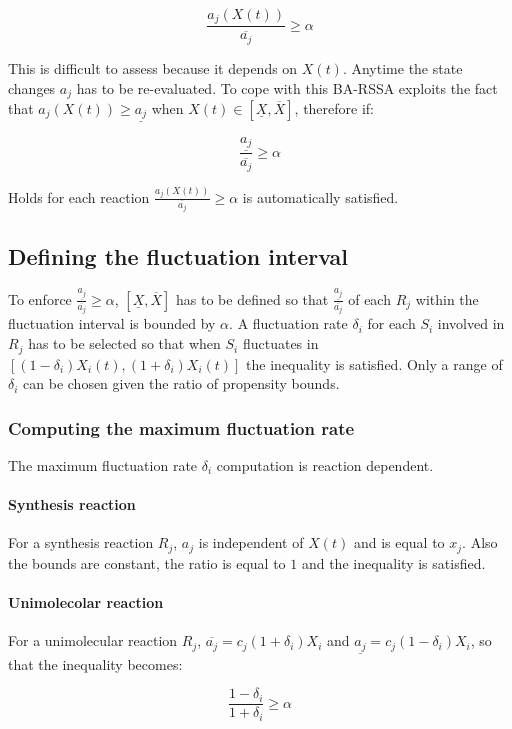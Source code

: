   $$\frac{a_j(X(t))}{\overline{a_j}} \ge \alpha$$

  This is difficult to assess because it depends on $X(t)$.
  Anytime the state changes $a_j$ has to be re-evaluated.
  To cope with this BA-RSSA exploits the fact that $a_j(X(t))\ge \underline{a_j}$ when $X(t)\in[\underline{X}, \overline{X}]$, therefore if:

  $$\frac{\underline{a_j}}{\overline{a_j}}\ge \alpha$$

  Holds for each reaction $\frac{a_j(X(t))}{\overline{a_j}} \ge\alpha$ is automatically satisfied.

  \subsection{Defining the fluctuation interval}
  To enforce $\frac{\underline{a_j}}{\overline{a_j}}\ge \alpha$, $[\underline{X}, \overline{X}]$ has to be defined so that $\frac{\underline{a_j}}{\overline{a_j}}$ of each $R_j$ within the fluctuation interval is bounded by $\alpha$.
  A fluctuation rate $\delta_i$ for each $S_i$ involved in $R_j$ has to be selected so that when $S_i$ fluctuates in $[(1-\delta_i)X_i(t), (1+\delta_i)X_i(t)]$ the inequality is satisfied.
  Only a range of $\delta_i$ can be chosen given the ratio of propensity bounds.

    \subsubsection{Computing the maximum fluctuation rate}
    The maximum fluctuation rate $\delta_i$ computation is reaction dependent.

      \paragraph{Synthesis reaction}
      For a synthesis reaction $R_j$, $a_j$ is independent of $X(t)$ and is equal to $x_j$.
      Also the bounds are constant, the ratio is equal to $1$ and the inequality is satisfied.

      \paragraph{Unimolecolar reaction}
      For a unimolecular reaction $R_j$, $\overline{a_j} = c_j(1+\delta_i)X_i$ and $\underline{a_j} = c_j(1-\delta_i)X_i$, so that the inequality becomes:

      $$\frac{1-\delta_i}{1+\delta_i}\ge\alpha$$

